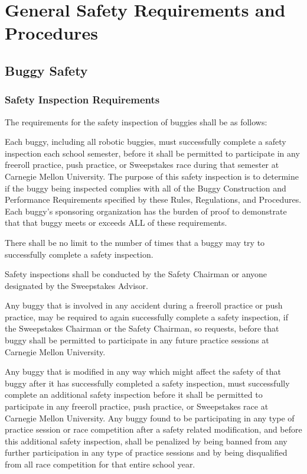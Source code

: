 \chapter{General Safety Requirements and Procedures}

\section{Buggy Safety}

\subsection{Safety Inspection Requirements}

	The requirements for the safety inspection of buggies shall be as follows:
	\newline

	Each buggy, including all robotic buggies, must successfully complete a safety inspection each school semester, before it shall be permitted to participate in any freeroll practice, push practice, or Sweepstakes race during that semester at Carnegie Mellon University. The purpose of this safety inspection is to determine if the buggy being inspected complies with all of the Buggy Construction and Performance Requirements specified by these Rules, Regulations, and Procedures. Each buggy's sponsoring organization has the burden of proof to demonstrate that that buggy meets or exceeds ALL of these requirements.

	There shall be no limit to the number of times that a buggy may try to successfully complete a safety inspection.

	Safety inspections shall be conducted by the Safety Chairman or anyone designated by the Sweepstakes Advisor.

	Any buggy that is involved in any accident during a freeroll practice or push practice, may be required to again successfully complete a safety inspection, if the Sweepstakes Chairman or the Safety Chairman, so requests, before that buggy shall be permitted to participate in any future practice sessions at Carnegie Mellon University.

	Any buggy that is modified in any way which might affect the safety of that buggy after it has successfully completed a safety inspection, must successfully complete an additional safety inspection before it shall be permitted to participate in any freeroll practice, push practice, or Sweepstakes race at Carnegie Mellon University. Any buggy found to be participating in any type of practice session or race competition after a safety related modification, and before this additional safety inspection, shall be penalized by being banned from any further participation in any type of practice sessions and by being disqualified from all race competition for that entire school year.

